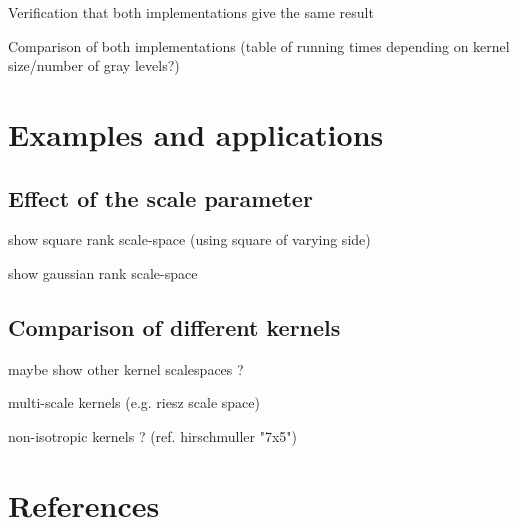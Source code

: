 \documentclass[12pt]{article}                  %
\begin{document}
Verification that both implementations give the same result

Comparison of both implementations (table of running times depending on
kernel size/number of gray levels?)

\section{Examples and applications}


\subsection{Effect of the scale parameter}

show square rank scale-space (using square of varying side)

show gaussian rank scale-space


\subsection{Comparison of different kernels}

maybe show other kernel scalespaces ?

multi-scale kernels (e.g. riesz scale space)

non-isotropic kernels ?
(ref. hirschmuller "7x5")



\section{References}
\end{document}
